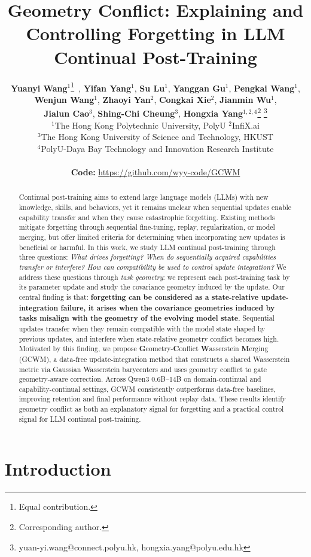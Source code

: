 \documentclass{article}
\title{{Geometry Conflict}: Explaining and Controlling Forgetting in LLM Continual Post-Training}
\author{%
\textbf{Yuanyi Wang}$^{1}$\thanks{Equal contribution.}\, \footnotemark[3],
\textbf{Yifan Yang}$^{1}$\footnotemark[1],
\textbf{Su Lu}$^{1}$,
\textbf{Yanggan Gu}$^{1}$,
\textbf{Pengkai Wang}$^{1}$, \\
\textbf{Wenjun Wang}$^{1}$,
\textbf{Zhaoyi Yan}$^{2}$,
\textbf{Congkai Xie}$^{2}$,
\textbf{Jianmin Wu}$^{1}$, \\
\textbf{Jialun Cao}$^{3}$,
\textbf{Shing-Chi Cheung}$^{3}$,
\textbf{Hongxia Yang}$^{1,2,4}$\thanks{Corresponding author.} \thanks{yuan-yi.wang@connect.polyu.hk, hongxia.yang@polyu.edu.hk} \\
$^{1}$The Hong Kong Polytechnic University, PolyU \quad
$^{2}$InfiX.ai \\
$^{3}$The Hong Kong University of Science and Technology, HKUST \\
$^{4}$PolyU-Daya Bay Technology and Innovation Research Institute \\
\\
\textbf{Code:} \textcolor{ruleNavy}{\url{https://github.com/wyy-code/GCWM}}
}
\begin{document}
\maketitle






\begin{abstract}
Continual post-training aims to extend large language models (LLMs) with new knowledge, skills, and behaviors, yet it remains unclear when sequential updates enable capability transfer and when they cause catastrophic forgetting.
Existing methods mitigate forgetting through sequential fine-tuning, replay, regularization, or model merging, but offer limited criteria for determining when incorporating new updates is beneficial or harmful.
In this work, we study LLM continual post-training through three questions: \textit{What drives forgetting? When do sequentially acquired capabilities transfer or interfere? How can compatibility be used to control update integration?}
We address these questions through \textit{task geometry}: we represent each post-training task by its parameter update and study the covariance geometry induced by the update.
Our central finding is that: \textbf{forgetting can be considered as a state-relative update-integration failure, it arises when the covariance geometries induced by tasks misalign with the geometry of the evolving model state}.
Sequential updates transfer when they remain compatible with the model state shaped by previous updates, and interfere when state-relative geometry conflict becomes high.
Motivated by this finding, we propose \textbf{G}eometry-\textbf{C}onflict \textbf{W}asserstein \textbf{M}erging (GCWM), a data-free update-integration method that constructs a shared Wasserstein metric via Gaussian Wasserstein barycenters and uses geometry conflict to gate geometry-aware correction.
Across Qwen3 0.6B--14B on domain-continual and capability-continual settings, GCWM consistently outperforms data-free baselines, improving retention and final performance without replay data.
These results identify geometry conflict as both an explanatory signal for forgetting and a practical control signal for LLM continual post-training.
\end{abstract}




\section{Introduction}
\end{document}
